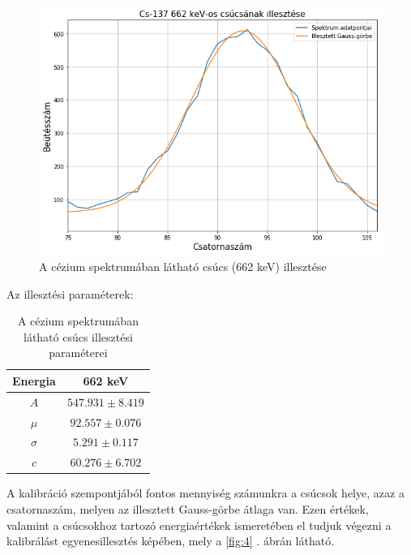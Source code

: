 \documentclass[12pt,a4paper]{article}
\begin{document}
\begin{figure}[!h]
\centering
\includegraphics[scale=0.60]{Cs137_1csucs}
\caption{A cézium spektrumában látható csúcs (662 keV) illesztése}
\label{fig:3}
\end{figure}
Az illesztési paraméterek:
\begin{table}[!h]
\begin{center}
\begin{tabular}{|c|c|}
\hline
Energia & 662 keV \\ 
\hline
$A$ & $547.931 \pm 8.419$\\
\hline
$\mu$ & $92.557 \pm 0.076$\\
\hline
$\sigma$ & $5.291 \pm 0.117$\\
\hline
$c$ & $60.276 \pm 6.702$\\
\hline
\end{tabular}
\caption{A cézium spektrumában látható csúcs illesztési paraméterei}
\end{center}
\end{table}

\newpage
A kalibráció szempontjából fontos mennyiség számunkra a csúcsok helye, azaz a csatornaszám, melyen az illesztett Gauss-görbe átlaga van. Ezen értékek, valamint a csúcsokhoz tartozó energiaértékek ismeretében el tudjuk végezni a kalibrálást egyenesillesztés képében, mely a \ref{fig:4} . ábrán látható.
\end{document}
